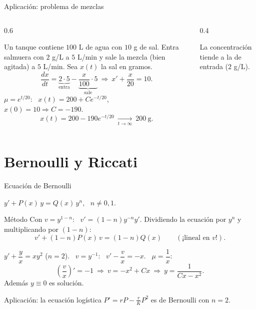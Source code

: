 \documentclass[10pt,aspectratio=169]{beamer}
\begin{document}
\begin{frame}{Aplicación: problema de mezclas}
  \begin{columns}
    \begin{column}{0.6\textwidth}
      \begin{ejemplo}[5]
        Un tanque contiene $100$ L de agua con $10$ g de sal. Entra salmuera con $2$ g/L a $5$ L/min y sale la mezcla (bien agitada) a
        $5$ L/min. Sea $x(t)$ la sal en gramos.
        \[ \frac{dx}{dt}=\underbrace{2\cdot5}_{\text{entra}}-\underbrace{\frac{x}{100}\cdot5}_{\text{sale}}\ \Rightarrow\ x'+\frac{x}{20}=10. \]
        $\mu=e^{t/20}$: \ $x(t)=200+Ce^{-t/20}$, \ $x(0)=10\Rightarrow C=-190$.
        \[ x(t)=200-190e^{-t/20}\ \xrightarrow[t\to\infty]{}\ 200\ \text{g}. \]
      \end{ejemplo}
    \end{column}
    \begin{column}{0.4\textwidth}
      \centering

      \small La concentración tiende a la de entrada ($2$ g/L).
    \end{column}
  \end{columns}
\end{frame}

\section{Bernoulli y Riccati}

\begin{frame}{Ecuación de Bernoulli}
  \begin{definicion}
    $y'+P(x)\,y=Q(x)\,y^n$, \ $n\ne0,1$.
  \end{definicion}
  \begin{block}{Método}
    Con $v=y^{1-n}$: \ $v'=(1-n)y^{-n}y'$. Dividiendo la ecuación por $y^n$ y multiplicando por $(1-n)$:
    \[ v'+(1-n)P(x)\,v=(1-n)Q(x)\qquad(\text{¡lineal en }v!). \]
  \end{block}
  \begin{ejemplo}[6]
    $y'+\dfrac yx=xy^2$ ($n=2$). \ $v=y^{-1}$: \ $v'-\dfrac vx=-x$. \ $\mu=\dfrac1x$:
    \[ \left(\frac vx\right)'=-1\ \Rightarrow\ v=-x^2+Cx\ \Rightarrow\ y=\frac{1}{Cx-x^2}. \]
    Además $y\equiv0$ es solución.
  \end{ejemplo}
  \small Aplicación: la ecuación logística $P'=rP-\frac rKP^2$ es de Bernoulli con $n=2$.
\end{frame}
\end{document}
